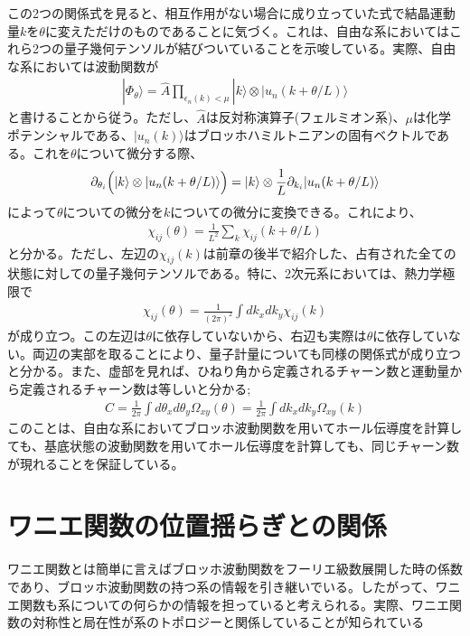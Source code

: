 \documentclass[12pt]{jsbook}
\newcommand{\ra}{\rangle}
\newcommand{\pa}{\partial}
\begin{document}
この2つの関係式を見ると、相互作用がない場合に成り立っていた式で結晶運動量$k$を$\theta$に変えただけのものであることに気づく。これは、自由な系においてはこれら2つの量子幾何テンソルが結びついていることを示唆している。実際、自由な系においては波動関数が
\begin{eqnarray}
    |\Phi_\theta\ra = \hat{A}\displaystyle \prod_{\epsilon_n(k)<\mu} |k\ra \otimes |u_n(k+\theta/L)\ra
\end{eqnarray}
と書けることから従う。ただし、$\hat{A}$は反対称演算子(フェルミオン系)、$\mu$は化学ポテンシャルである、$|u_n(k)\ra$はブロッホハミルトニアンの固有ベクトルである。これを$\theta$について微分する際、
\begin{eqnarray}
\pa_{\theta_i}\Bigl(|k\ra \otimes |u_n(k+\theta/L)\ra\Bigr)
=|k\ra \otimes \frac{1}{L}\pa_{k_i}|u_n(k+\theta/L)\ra
\end{eqnarray}
によって$\theta$についての微分を$k$についての微分に変換できる。これにより、
\begin{eqnarray}
    \chi_{ij}(\theta) = \frac{1}{L^2}\displaystyle \sum_k \chi_{ij}(k+\theta/L)
\end{eqnarray}
と分かる。ただし、左辺の$\chi_{ij}(k)$は前章の後半で紹介した、占有された全ての状態に対しての量子幾何テンソルである。特に、2次元系においては、熱力学極限で
\begin{eqnarray}
    \chi_{ij}(\theta)=\frac{1}{(2\pi)^2}\int　dk_xdk_y \chi_{ij}(k)
\end{eqnarray}
が成り立つ\cite{PhysRevB.104.045103}。この左辺は$\theta$に依存していないから、右辺も実際は$\theta$に依存していない。両辺の実部を取ることにより、量子計量についても同様の関係式が成り立つと分かる。また、虚部を見れば、ひねり角から定義されるチャーン数と運動量から定義されるチャーン数は等しいと分かる;
\begin{eqnarray}
    C=\frac{1}{2\pi}\int d\theta_x d\theta_y \Omega_{xy}(\theta)=\frac{1}{2\pi}\int dk_x dk_y \Omega_{xy}(k)
\end{eqnarray}
このことは、自由な系においてブロッホ波動関数を用いてホール伝導度を計算しても、基底状態の波動関数を用いてホール伝導度を計算しても、同じチャーン数が現れることを保証している。


\section{ワニエ関数の位置揺らぎとの関係}
ワニエ関数とは簡単に言えばブロッホ波動関数をフーリエ級数展開した時の係数であり、ブロッホ波動関数の持つ系の情報を引き継いでいる。したがって、ワニエ関数も系についての何らかの情報を担っていると考えられる。実際、ワニエ関数の対称性と局在性が系のトポロジーと関係していることが知られている\cite{PhysRevLett.121.126402,2022arXiv220900007H}
\end{document}
